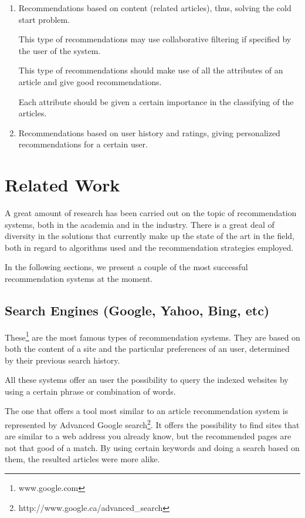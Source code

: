 \begin{enumerate}
  \item Recommendations based on content (related articles), thus, solving the cold start problem.
  
  	This type of recommendations may use collaborative filtering if specified by the user of the system.
    
    This type of recommendations should make use of all the attributes of an article and give good recommendations.
   
    Each attribute should be given a certain importance in the classifying of the articles.
  
  \item Recommendations based on user history and ratings, giving personalized recommendations for a certain user.
\end{enumerate}



\section{Related Work}
\label{sub-sec:related-work}

A great amount of research \cite{evaluate-recommender-system} has been carried out on the topic of recommendation systems, both in the academia and in the industry. There is a great deal of diversity in the solutions that currently make up the state of the art in the field, both in regard to algorithms used and the recommendation strategies employed. 

In the following sections, we present a couple of the most successful recommendation systems at the moment.
\nocite{*}

\subsection{Search Engines (Google, Yahoo, Bing, etc)}

These\footnote{www.google.com}  are the most famous types of recommendation systems. They are based on both the content of a site and the particular preferences of an user, determined by their previous search history. 

All these systems offer an user the possibility to query the indexed websites by using a certain phrase or combination of words.

The one that offers a tool most similar to an article recommendation system is represented by Advanced Google search\footnote{http://www.google.ca/advanced_search}. It offers the possibility to find sites that are similar to a web address you already know, but the recommended pages are not that good of a match. By using certain keywords and doing a search based on them, the resulted articles were more alike.

